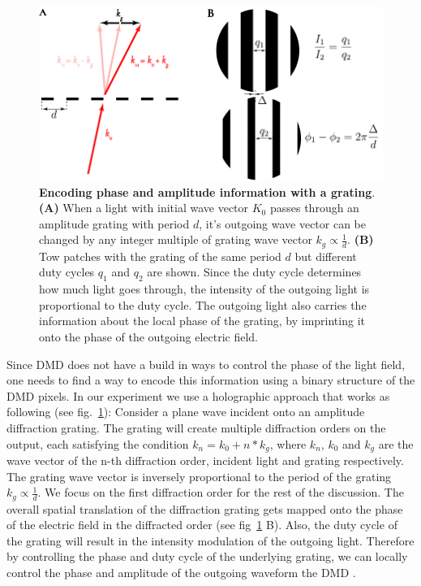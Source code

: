 \begin{figure}[t]
	\centering
	\includegraphics[scale=1]{figures/DMD_grating.pdf}
	\caption{{\bf Encoding phase and amplitude information with a grating}. {\bf (A)} When a light with initial wave vector $K_0$ passes through an amplitude grating with period $d$, it's outgoing wave vector can be changed by any integer multiple of grating wave vector $k_g\propto \frac{1}{d}$. {\bf (B)} Tow patches with the grating of the same period $d$ but different duty cycles $q_1$ and $q_2$ are shown. Since the duty cycle determines how much light goes through, the intensity of the outgoing light is proportional to the duty cycle. The outgoing light also carries the information about the local phase of the grating, by imprinting it onto the phase of the outgoing electric field.}
	\label{fig:DMD_grating}
\end{figure}

Since DMD does not have a build in ways to control the phase of the light field, one needs to find a way to encode this information using a binary structure of the DMD pixels. In our experiment we use a holographic approach that works as following (see fig.~\ref{fig:DMD_grating}): Consider a plane wave incident onto an amplitude diffraction grating. The grating will create multiple diffraction orders on the output, each satisfying the condition $k_n = k_0 + n*k_g$, where $k_n$, $k_0$ and $k_g$ are the wave vector of the n-th diffraction order, incident light and grating respectively. The grating wave vector is inversely proportional to the period of the grating $k_g \propto \frac{1}{d}$. We focus on the first diffraction order for the rest of the discussion. The overall spatial translation of the diffraction grating gets mapped onto the phase of the electric field in the diffracted order (see fig~\ref{fig:DMD_grating} B). Also, the duty cycle of the grating will result in the intensity modulation of the outgoing light. Therefore by controlling the phase and duty cycle of the underlying grating, we can locally control the phase and amplitude of the outgoing waveform the DMD \cite{Zupanchich thesis}.

